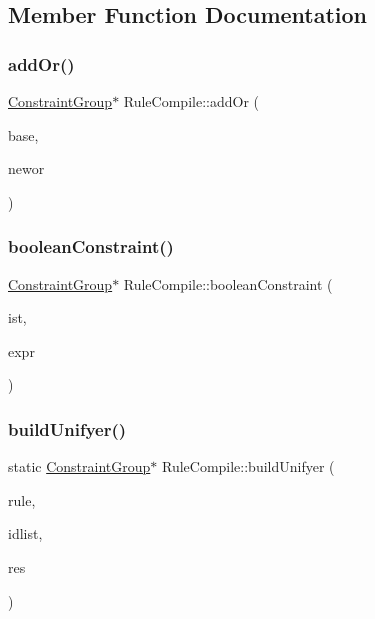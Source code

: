 \subsection{Member Function Documentation}
\mbox{\label{class_rule_compile_a3f191e9f060a35b14439e6caa7711d7b}} 
\subsubsection{\texorpdfstring{addOr()}{addOr()}}
{\footnotesize\ttfamily \mbox{\hyperlink{class_constraint_group}{Constraint\+Group}}$\ast$ Rule\+Compile\+::add\+Or (\begin{DoxyParamCaption}\item[{\mbox{\hyperlink{class_constraint_group}{Constraint\+Group}} $\ast$}]{base,  }\item[{\mbox{\hyperlink{class_constraint_group}{Constraint\+Group}} $\ast$}]{newor }\end{DoxyParamCaption})}

\mbox{\label{class_rule_compile_a4098cd7d4e0fa4af52720ccdace68b47}} 
\subsubsection{\texorpdfstring{booleanConstraint()}{booleanConstraint()}}
{\footnotesize\ttfamily \mbox{\hyperlink{class_constraint_group}{Constraint\+Group}}$\ast$ Rule\+Compile\+::boolean\+Constraint (\begin{DoxyParamCaption}\item[{bool}]{ist,  }\item[{\mbox{\hyperlink{class_r_h_s_constant}{R\+H\+S\+Constant}} $\ast$}]{expr }\end{DoxyParamCaption})}

\mbox{\label{class_rule_compile_a01438d844a28a2e64afc725ce97d0b5b}} 
\subsubsection{\texorpdfstring{buildUnifyer()}{buildUnifyer()}}
{\footnotesize\ttfamily static \mbox{\hyperlink{class_constraint_group}{Constraint\+Group}}$\ast$ Rule\+Compile\+::build\+Unifyer (\begin{DoxyParamCaption}\item[{const string \&}]{rule,  }\item[{const vector$<$ string $>$ \&}]{idlist,  }\item[{vector$<$ int4 $>$ \&}]{res }\end{DoxyParamCaption})\hspace{0.3cm}{\ttfamily [static]}}

